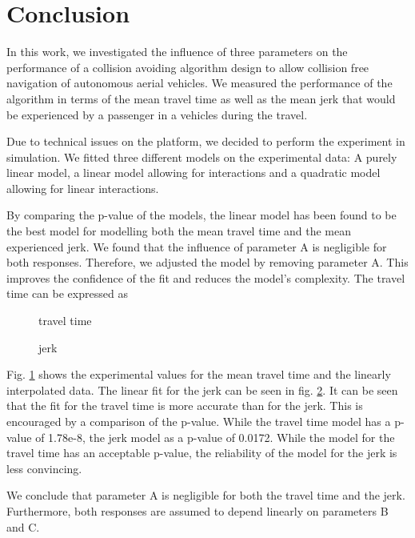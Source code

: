 \section{Conclusion}

In this work, we investigated the influence of three parameters on the performance of a collision avoiding algorithm design to allow collision free navigation of autonomous aerial vehicles. We measured the performance of the algorithm in terms of the mean travel time as well as the mean jerk that would be experienced by a passenger in a vehicles during the travel.

Due to technical issues on the platform, we decided to perform the experiment in simulation.
We fitted three different models on the experimental data: A purely linear model, a linear model allowing for interactions and a quadratic model allowing for linear interactions.

By comparing the p-value of the models, the linear model has been found to be the best model for modelling both the mean travel time and the mean experienced jerk. We found that the influence of parameter A is negligible for both responses. Therefore, we adjusted the model by removing parameter A. This improves the confidence of the fit and reduces the model's complexity. The travel time can be expressed as 

\begin{figure}[h]
	\centering
		\setlength{\figH}{0.23\textwidth}
		
		\caption{travel time}\label{fig:concl_time}
\end{figure}	
\begin{figure}
    		\centering
		\setlength{\figH}{0.23\textwidth}		
		
		\caption{jerk}\label{fig:concl_jerk}
\end{figure}

Fig. \ref{fig:concl_time} shows the experimental values for the mean travel time and the linearly interpolated data. The linear fit for the jerk can be seen in fig. \ref{fig:concl_jerk}. It can be seen that the fit for the travel time is more accurate than for the jerk. This is encouraged by a comparison of the p-value. While the travel time model has a p-value of 1.78e-8, the jerk model as a p-value of 0.0172. While the model for the travel time has an acceptable p-value, the reliability of the model for the jerk is less convincing.

We conclude that parameter A is negligible for both the travel time and the jerk. Furthermore, both responses are assumed to depend linearly on parameters B and C.